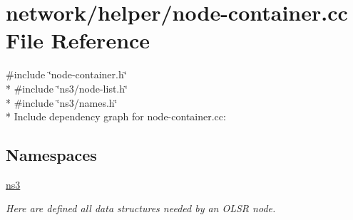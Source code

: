 \hypertarget{node-container_8cc}{}\section{network/helper/node-\/container.cc File Reference}
\label{node-container_8cc}
{\ttfamily \#include \char`\"{}node-\/container.\+h\char`\"{}}\\*
{\ttfamily \#include \char`\"{}ns3/node-\/list.\+h\char`\"{}}\\*
{\ttfamily \#include \char`\"{}ns3/names.\+h\char`\"{}}\\*
Include dependency graph for node-\/container.cc\+:
\subsection*{Namespaces}
\begin{DoxyCompactItemize}
\item 
 \hyperlink{namespacens3}{ns3}
\begin{DoxyCompactList}\small\item\em Here are defined all data structures needed by an O\+L\+SR node. \end{DoxyCompactList}\end{DoxyCompactItemize}
